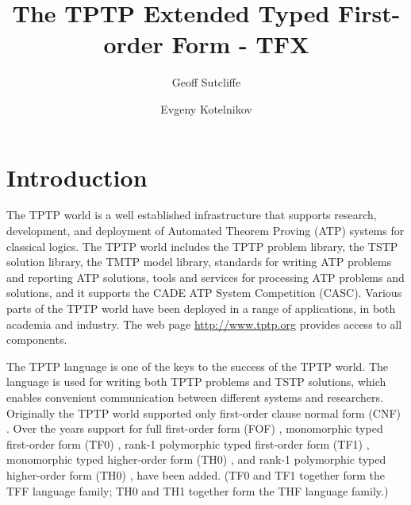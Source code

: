 \documentclass{easychair}
\begin{document}
\title{The TPTP Extended Typed First-order Form - TFX}
\author{
    Geoff Sutcliffe
\and
    Evgeny Kotelnikov
}
\clearpage
\maketitle

\begin{abstract}
\end{abstract}

\section{Introduction}
\label{Introduction}

The TPTP world \cite{Sut10} is a well established infrastructure that supports
research, development, and deployment of Automated Theorem Proving (ATP)
systems for classical logics.
The TPTP world includes the TPTP problem library,
the TSTP solution library,
the TMTP model library,
standards for writing ATP problems and reporting ATP solutions,
tools and services for processing ATP problems and solutions,
and it supports the CADE ATP System Competition (CASC).
Various parts of the TPTP world have been deployed in a range of applications,
in both academia and industry.
The web page \url{http://www.tptp.org} provides access to all components.

The TPTP language is one of the keys to the success of the TPTP world.
The language is used for writing both TPTP problems and TSTP solutions,
which enables convenient communication between different systems and
researchers.
Originally the TPTP world supported only first-order clause normal form (CNF)
\cite{SS98-JAR}.
Over the years support for full first-order form (FOF) \cite{Sut09},
monomorphic typed first-order form (TF0) \cite{SS+12}, rank-1 polymorphic
typed first-order form (TF1) \cite{BP13-TFF1}, monomorphic typed higher-order 
form (TH0) \cite{SB10}, and rank-1 polymorphic typed higher-order form (TH0) 
\cite{KSR16}, have been added.
(TF0 and TF1 together form the TFF language family; TH0 and TH1 together form 
the THF language family.)
\end{document}
